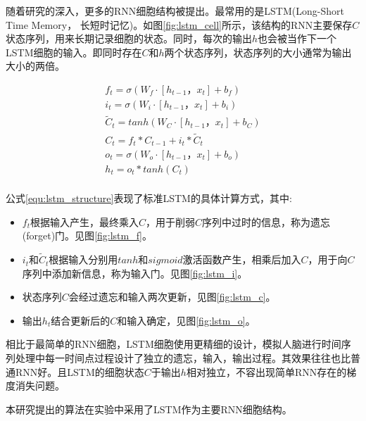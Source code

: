随着研究的深入，更多的RNN细胞结构被提出。最常用的是LSTM(Long-Short Time Memory， 长短时记忆)\supercite{hochreiter1997long}。如图\ref{fig:lstm_cell}所示，该结构的RNN主要保存$C$状态序列，用来长期记录细胞的状态。同时，每次的输出$h$也会被当作下一个LSTM细胞的输入。即同时存在$C$和$h$两个状态序列，状态序列的大小通常为输出大小的两倍。
\par
\begin{equation} \label{equ:lstm_structure}
    \begin{gathered}
        f_t = \sigma (W_f \cdot [h_{t-1}， x_t] + b_f) \\
        i_t = \sigma (W_i \cdot [h_{t-1}， x_t] + b_i) \\
        \tilde{C}_t = tanh (W_C \cdot [h_{t-1}， x_t] + b_C) \\
        C_t = f_t * C_{t-1}+i_t * \tilde{C}_t \\
        o_t = \sigma (W_o \cdot [h_{t-1}， x_t] + b_o) \\
        h_t = o_t * tanh(C_t) \\
    \end{gathered}
\end{equation}
\par
公式\ref{equ:lstm_structure}表现了标准LSTM的具体计算方式\supercite{Understanding-LSTMs}，其中:
\begin{itemize}
    \item $f_t$根据输入产生，最终乘入$C$，用于削弱$C$序列中过时的信息，称为遗忘(forget)门。见图\ref{fig:lstm_f}。
    \item $i_t$和$\tilde{C}_t$根据输入分别用$tanh$和$sigmoid$激活函数产生，相乘后加入$C$，用于向$C$序列中添加新信息，称为输入门。见图\ref{fig:lstm_i}。
    \item 状态序列$C$会经过遗忘和输入两次更新，见图\ref{fig:lstm_c}。
    \item 输出$h_t$结合更新后的$C$和输入确定，见图\ref{fig:lstm_o}。
\end{itemize}
相比于最简单的RNN细胞，LSTM细胞使用更精细的设计，模拟人脑进行时间序列处理中每一时间点过程设计了独立的遗忘，输入，输出过程。其效果往往也比普通RNN好。且LSTM的细胞状态$C$于输出$h$相对独立，不容出现简单RNN存在的梯度消失问题\supercite{hochreiter1997long}。
\par
本研究提出的算法在实验中采用了LSTM作为主要RNN细胞结构。

